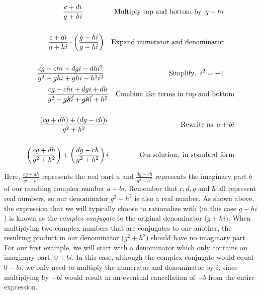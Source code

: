 \begin{eqnarray*}
    \dfrac{c+di}{g+hi}~~~~~~~~~&  & \tmop{Multiply~top~and~bottom~by~}g-hi\\
		&&\\
    \dfrac{c+di}{g+hi}\cdot\left(\dfrac{g-hi}{g-hi}\right) &  & \tmop{Expand~numerator~and~denominator}\\
    &&\\
		\dfrac{cg-chi+dgi-dhi^2}{g^2-ghi+ghi-h^2i^2} &  & \tmop{Simplify,~} i^2=-1%
\end{eqnarray*}
\begin{eqnarray*}
		\dfrac{cg-chi+dgi+dh}{g^2-\cancel{ghi}+\cancel{ghi}+h^2} & & \operatorname{Combine~like~terms~in~top~and~bottom}\\
    &&\\
		\dfrac{(cg+dh)+(dg-ch)i}{g^2+h^2} & & \operatorname{Rewrite~as~} a+bi\\
		&&\\
		\left(\dfrac{cg+dh}{g^2+h^2}\right)+\left(\dfrac{dg-ch}{g^2+h^2}\right)i &  & \operatorname{Our} \operatorname{solution,~in~standard~form}
\end{eqnarray*}

Here, $\frac{cg+dh}{g^2+h^2}$ represents the real part $a$ and $\frac{dg-ch}{g^2+h^2}$ represents the imaginary part $b$ of our resulting complex number $a+bi$.  Remember that $c,d,g$ and $h$ all represent real numbers, so our denominator $g^2+h^2$ is also a real number.\pp
As shown above, the expression that we will typically choose to rationalize with (in this case $g-hi$) is known as the \textit{complex conjugate} to the original denominator ($g+hi$).  When multiplying two complex numbers that are conjugates to one another, the resulting product in our denominator ($g^2+h^2$) should have no imaginary part.\pp
For our first example, we will start with a denominator which only contains an imaginary part, $0+bi$.  In this case, although the complex conjugate would equal $0-bi$, we only need to multiply the numerator and denominator by $i$, since multiplying by $-bi$ would result in an eventual cancellation of $-b$ from the entire expression.
 
